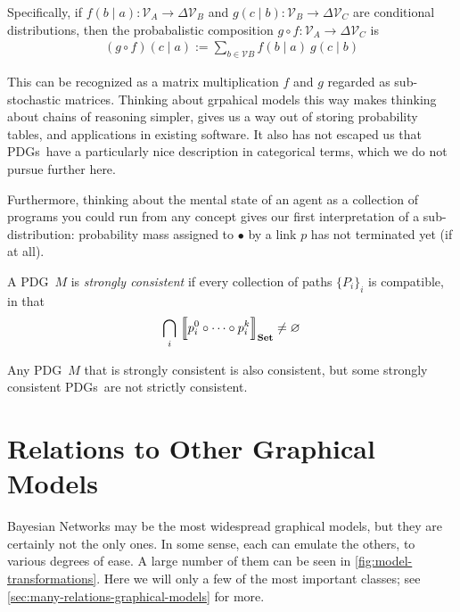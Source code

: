 \documentclass{article}
\newcommand\Set{\textbf{Set}}
\newcommand{\MN}{PDG}
\newcommand{\MNs}{\MN s}
\begin{document}
	Specifically, if $f(b \mid a) : \mathcal V_A \to \Delta \mathcal V_B$ and $g(c \mid b) : \mathcal V_B \to \Delta \mathcal V_C$ are conditional distributions, then the probabalistic composition $g\circ f : \mathcal V_A \to \Delta\mathcal V_C$ is
	\begin{align*}
			(g\circ  f) (c \mid a) :=  \sum_{b \in \mathcal V B}\!\! f (b \mid a)\ g(c \mid b)
	\end{align*}
	
	This can be recognized as a matrix multiplication $f$ and $g$ regarded as sub-stochastic matrices.
	Thinking about grpahical models this way makes thinking about chains of reasoning simpler, gives us a way out of storing probability tables, and applications in existing software. It also has not escaped us that \MNs\ have a particularly nice description in categorical terms, which we do not pursue further here.
	
	Furthermore, thinking about the mental state of an agent as a collection of programs you could run from any concept gives our first interpretation of a sub-distribution: probability mass assigned to $\bullet$ by a link $p$ has not terminated yet (if at all). 
	
	\begin{defn}
		A \MN\ $M$ is \emph{strongly consistent} if every collection of paths $\{P_i\}_i$ is compatible, in that 
		$$\bigcap_i\ \bbr*{\vphantom{\Big|}p_i^0\circ \cdots\circ p_i^k}_\Set \neq \varnothing$$
	\end{defn}

	\begin{prop}
		Any \MN\ $M$ that is strongly consistent is also consistent, but some strongly consistent \MNs\ are not strictly consistent.
	\end{prop}

	
	

	\section{Relations to Other Graphical Models}\label{sec:other-graphical-models}
	
	Bayesian Networks may be the most widespread graphical models, but they are certainly not the only ones. In some sense, each can emulate the others, to various degrees of ease. A large number of them can be seen in \cref{fig:model-transformations}. Here we will only a few of the most important classes; see \cref{sec:many-relations-graphical-models} for more.
\end{document}
